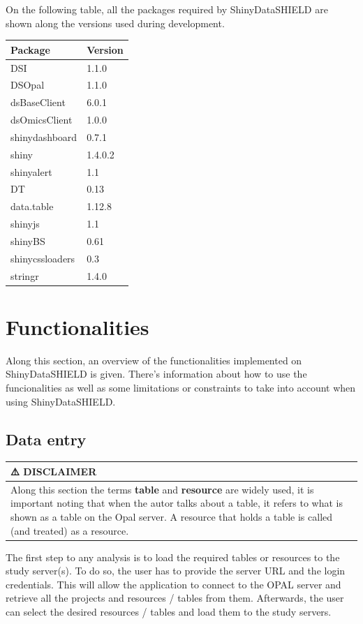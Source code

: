 \documentclass[
]{book}
\begin{document}
On the following table, all the packages required by ShinyDataSHIELD are shown along the versions used during development.

\begin{longtable}[]{@{}ll@{}}
\toprule
Package & Version\tabularnewline
\midrule
\endhead
DSI & 1.1.0\tabularnewline
DSOpal & 1.1.0\tabularnewline
dsBaseClient & 6.0.1\tabularnewline
dsOmicsClient & 1.0.0\tabularnewline
shinydashboard & 0.7.1\tabularnewline
shiny & 1.4.0.2\tabularnewline
shinyalert & 1.1\tabularnewline
DT & 0.13\tabularnewline
data.table & 1.12.8\tabularnewline
shinyjs & 1.1\tabularnewline
shinyBS & 0.61\tabularnewline
shinycssloaders & 0.3\tabularnewline
stringr & 1.4.0\tabularnewline
\bottomrule
\end{longtable}

\hypertarget{functionalities}{%
\chapter{Functionalities}\label{functionalities}}

Along this section, an overview of the functionalities implemented on ShinyDataSHIELD is given. There's information about how to use the funcionalities as well as some limitations or constraints to take into account when using ShinyDataSHIELD.

\hypertarget{data-entry}{%
\section{Data entry}\label{data-entry}}

\begin{longtable}[]{@{}l@{}}
\toprule
\begin{minipage}[b]{0.97\columnwidth}\raggedright
⚠️ DISCLAIMER\strut
\end{minipage}\tabularnewline
\midrule
\endhead
\begin{minipage}[t]{0.97\columnwidth}\raggedright
Along this section the terms \textbf{table} and \textbf{resource} are widely used, it is important noting that when the autor talks about a table, it refers to what is shown as a table on the Opal server. A resource that holds a table is called (and treated) as a resource.\strut
\end{minipage}\tabularnewline
\bottomrule
\end{longtable}

The first step to any analysis is to load the required tables or resources to the study server(s). To do so, the user has to provide the server URL and the login credentials. This will allow the application to connect to the OPAL server and retrieve all the projects and resources / tables from them. Afterwards, the user can select the desired resources / tables and load them to the study servers.
\end{document}
